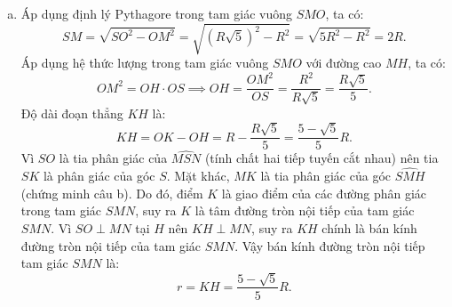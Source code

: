 \begin{bt}
{\begin{enumerate}[a)]
	Xét tam giác $OMK$ có $OM = OK = R$ nên tam giác $OMK$ cân tại $O$, suy ra:
	$$\widehat{OMK} = \widehat{OKM}.$$
	Tam giác $SMO$ vuông tại $M$ nên $\widehat{SMK} + \widehat{OMK} = \widehat{SMO} = 90^\circ$.
	Tam giác $MHK$ vuông tại $H$ nên $\widehat{HMK} + \widehat{HKM} = 90^\circ \implies \widehat{HMK} + \widehat{OKM} = 90^\circ$.
	Suy ra $\widehat{SMK} = \widehat{HMK}$, do đó $MK$ là tia phân giác của góc $\widehat{SMH}$.
	Áp dụng tính chất đường phân giác trong tam giác $SMH$, ta có:
	$$\dfrac{KS}{KH} = \dfrac{MS}{MH} \implies MH \cdot KS = KH \cdot MS.$$
	\item Áp dụng định lý Pythagore trong tam giác vuông $SMO$, ta có:
	$$SM = \sqrt{SO^2 - OM^2} = \sqrt{(R\sqrt{5})^2 - R^2} = \sqrt{5R^2 - R^2} = 2R.$$
	Áp dụng hệ thức lượng trong tam giác vuông $SMO$ với đường cao $MH$, ta có:
	$$OM^2 = OH \cdot OS \implies OH = \dfrac{OM^2}{OS} = \dfrac{R^2}{R\sqrt{5}} = \dfrac{R\sqrt{5}}{5}.$$
	Độ dài đoạn thẳng $KH$ là:
	$$KH = OK - OH = R - \dfrac{R\sqrt{5}}{5} = \dfrac{5 - \sqrt{5}}{5}R.$$
	Vì $SO$ là tia phân giác của $\widehat{MSN}$ (tính chất hai tiếp tuyến cắt nhau) nên tia $SK$ là phân giác của góc $S$.
	Mặt khác, $MK$ là tia phân giác của góc $\widehat{SMH}$ (chứng minh câu b).
	Do đó, điểm $K$ là giao điểm của các đường phân giác trong tam giác $SMN$, suy ra $K$ là tâm đường tròn nội tiếp của tam giác $SMN$.
	Vì $SO \perp MN$ tại $H$ nên $KH \perp MN$, suy ra $KH$ chính là bán kính đường tròn nội tiếp của tam giác $SMN$.
	Vậy bán kính đường tròn nội tiếp tam giác $SMN$ là:
	$$r = KH = \dfrac{5 - \sqrt{5}}{5}R.$$
\end{enumerate}
}
\end{bt}

